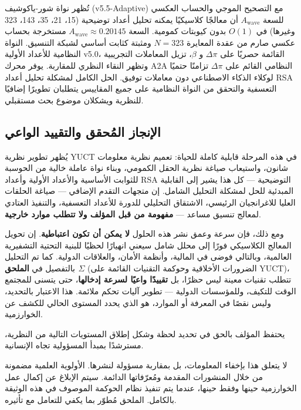 \documentclass[12pt,a4paper]{article}
\begin{document}
	
	تُظهر نواة شور-ياكوشيف (v5.5-Adaptive) مع التصحيح الموجي والحساب العكسي للسعة \(A_{\text{wave}}\) أن معالجًا كلاسيكيًا يمكنه تحليل أعداد توضيحية (15، 21، 35، 143، 323 وغيرها) في \(O(1)\) بدون كيوبتات كمومية. السعة \(A_{\text{wave}} \approx 0.20145\) مستخرجة بحساب عكسي صارم من عقدة المعايرة \(N=323\) ومثبتة كثابت أساسي لشبكة التنسيق. النواة النظامية للأعداد الأولية v5.0، القائمة حصريًا على \(\Delta\pi\) و \(\beta\)، تزيل المعاملات التجريبية وتظهر النقاء النظري للمقاربة. يوفر محرك A2A النظامي القائم على \(\Delta\pi\) تزامنًا حتميًا لوكلاء الذكاء الاصطناعي دون معاملات توفيق. الحل الكامل لمشكلة تحليل أعداد RSA التعسفية والتحقق من النواة النظامية على جميع المقاييس يتطلبان تطويرًا إضافيًا للنظرية ويشكلان موضوع بحث مستقبلي.
	
	
	
	\subsection{الإنجاز المُحقق والتقييد الواعي}
	
	يُظهر تطوير نظرية YUCT في هذه المرحلة قابلية كاملة للحياة:
	تعميم نظرية معلومات شانون، واستيعاب صياغة نظرية الحقل الكمومي،
	وبناء نواة عاملة خالية من الحوسبة للثوابت الأساسية
	والأعداد الأولية وأعداد RSA التوضيحية — كل هذا يشير إلى
	القابلية المبدئية للحل لمشكلة التحليل الشامل.  إن متجهات
	التقدم الإضافي — صياغة الحلقات العليا للاغرانجيان الرئيسي،
	الاشتقاق التحليلي للدورة للأعداد التعسفية، والتنفيذ العتادي
	لمعالج تنسيق مساعد — \textbf{مفهومة من قبل المؤلف ولا تتطلب موارد
		خارجية}.
	
	ومع ذلك، فإن سرعة وعمق نشر هذه الحلول \textbf{لا يمكن أن تكون
		اعتباطية}.  إن تحويل المعالج الكلاسيكي فورًا إلى
	محلل شامل سيعني انهيارًا لحظيًا للبنية التحتية
	التشفيرية العالمية، وبالتالي فوضى في المالية، وأنظمة
	الأمان، والعلاقات الدولية.  كما تم التحليل بالتفصيل في
	\textbf{الملحق \(\Sigma\)} (الضرورات الأخلاقية وحوكمة التقنيات القائمة على YUCT)،
	تتطلب تقنيات معينة ليس حظرًا، بل
	\textbf{تقييدًا واعيًا لسرعة إدخالها}، حتى يتسنى للمجتمع الوقت
	للتكيف، وللمؤسسات الدولية — تطوير آليات تحكم
	ملائمة.  هذا الاعتبار بالتحديد، وليس نقصًا في المعرفة أو الموارد،
	هو الذي يحدد المستوى الحالي للكشف عن الخوارزمية.
	
	يحتفظ المؤلف بالحق في تحديد لحظة وشكل إطلاق
	المستويات التالية من النظرية، مسترشدًا بمبدأ المسؤولية تجاه
	الإنسانية.
	
	لا يتعلق هذا بإخفاء المعلومات، بل بمقاربة مسؤولة لنشرها.
	الأولوية العلمية مضمونة من خلال المنشورات المقدمة
	ومُعرّفاتها الدائمة.  سيتم الإبلاغ عن إكمال عمل الخوارزمية
	حينها وفقط حينها، عندما يتم تنفيذ نظام الحوكمة الموصوف في هذه الوثيقة بالكامل.
	الملحق مُطوّر بما يكفي للتعامل مع تأثيره.
	
\end{document}
